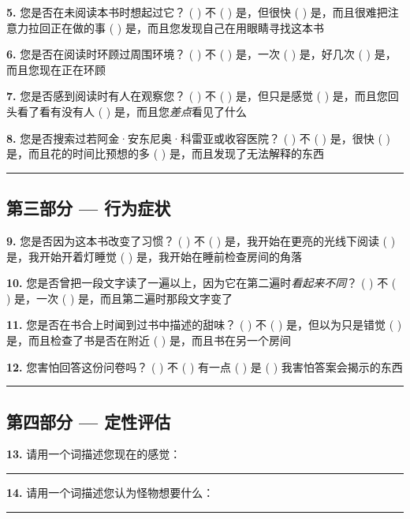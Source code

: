 \noindent \textbf{5.} 您是否在未阅读本书时想起过它？
( ) 不
( ) 是，但很快
( ) 是，而且很难把注意力拉回正在做的事
( ) 是，而且您发现自己在用眼睛寻找这本书

\noindent \textbf{6.} 您是否在阅读时环顾过周围环境？
( ) 不
( ) 是，一次
( ) 是，好几次
( ) 是，而且您现在正在环顾

\noindent \textbf{7.} 您是否感到阅读时有人在观察您？
( ) 不
( ) 是，但只是感觉
( ) 是，而且您回头看了看有没有人
( ) 是，而且您\textit{差点}看见了什么

\noindent \textbf{8.} 您是否搜索过若阿金·安东尼奥·科雷亚或收容医院？
( ) 不
( ) 是，很快
( ) 是，而且花的时间比预想的多
( ) 是，而且发现了无法解释的东西

\vspace{0.5em}\noindent\rule{\textwidth}{0.5pt}\vspace{0.5em}

\subsection*{第三部分 --- 行为症状}

\noindent \textbf{9.} 您是否因为这本书改变了习惯？
( ) 不
( ) 是，我开始在更亮的光线下阅读
( ) 是，我开始开着灯睡觉
( ) 是，我开始在睡前检查房间的角落

\noindent \textbf{10.} 您是否曾把一段文字读了一遍以上，因为它在第二遍时\textit{看起来不同}？
( ) 不
( ) 是，一次
( ) 是，而且第二遍时那段文字变了

\noindent \textbf{11.} 您是否在书合上时闻到过书中描述的甜味？
( ) 不
( ) 是，但以为只是错觉
( ) 是，而且检查了书是否在附近
( ) 是，而且书在另一个房间

\noindent \textbf{12.} 您害怕回答这份问卷吗？
( ) 不
( ) 有一点
( ) 是
( ) 我害怕答案会揭示的东西

\vspace{0.5em}\noindent\rule{\textwidth}{0.5pt}\vspace{0.5em}

\subsection*{第四部分 --- 定性评估}

\noindent \textbf{13.} 请用一个词描述您现在的感觉：

\noindent\rule{0.92\textwidth}{0.4pt}

\noindent \textbf{14.} 请用一个词描述您认为怪物想要什么：

\noindent\rule{0.92\textwidth}{0.4pt}

